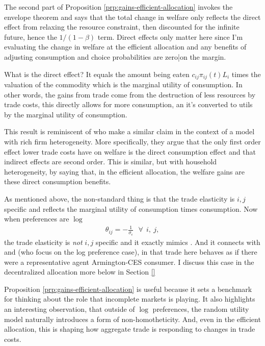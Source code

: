 \documentclass[12pt,pdftex]{article}
\begin{document}
\begin{onehalfspacing}
The second part of Proposition \ref{prp:gains-efficient-allocation} invokes the envelope theorem and says that the total change in welfare only reflects the direct effect from relaxing the resource constraint, then discounted for the infinite future, hence the $1/ (1-\beta)$ term. Direct effects only matter here since I'm evaluating the change in welfare at the efficient allocation and any benefits of adjusting consumption and choice probabilities are zero|on the margin.

What is the direct effect? It equals the amount being eaten $c_{ij} \pi_{ij}(t) L_i$ times the valuation of the commodity which is the marginal utility of consumption. In other words, the gains from trade come from the destruction of less resources by trade costs, this directly allows for more consumption, an it's converted to utils by the marginal utility of consumption.

This result is reminiscent of \citet{AtkesonBurstein2010} who make a similar claim in the context of a model with rich firm heterogeneity. More specifically, they argue that the only first order effect lower trade costs have on welfare is the direct consumption effect and that indirect effects are second order. This is similar, but with household heterogeneity, by saying that, in the efficient allocation, the welfare gains are these direct consumption benefits.

As mentioned above, the non-standard thing is that the trade elasticity is $i,j$ specific and reflects the marginal utility of consumption times consumption. Now when preferences are $\log$
\begin{align}
\theta_{ij} = -\frac{1}{\sigma_{\epsilon}} \ \ \ \forall \ \ i,\ j,
\end{align}
the trade elasticity is \textit{not} $i,j$ specific and it exactly mimics \citet{eaton2002technology}. And it connects with \citet{anderson1987ces} and \citet{anderson1992discrete} (who focus on the log preference case), in that trade here behaves as if there were a representative agent Armington-CES consumer. I discuss this case in the decentralized allocation more below in Section \ref{}

Proposition \ref{prp:gains-efficient-allocation} is useful because it sets a benchmark for thinking about the role that incomplete markets is playing. It also highlights an interesting observation, that outside of $\log$ preferences, the random utility model naturally introduces a form of non-homotheticity. And, even in the efficient allocation, this is shaping how aggregate trade is responding to changes in trade costs.




\end{onehalfspacing}
\end{document}
